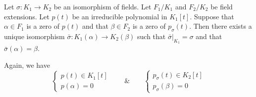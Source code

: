 \begin{prop}
Let $\sigma :K_1\rightarrow K_2$ be an isomorphism of fields. Let $F_1/K_1$ and $F_2/K_2$ be field extensions. Let $p(t)$ be an irreducible polynomial in $K_1[t]$. Suppose that $\alpha\in F_1 $ is a zero of $p(t)$ and that $\beta \in F_2$ is a zero of $p_{\sigma }(t)$. Then there exists a unique isomorphism $\bar{\sigma }:K_1(\alpha )\rightarrow K_2(\beta )$ such that $\bar{\sigma }|_{K_1}=\sigma $ and that $\bar{\sigma }(\alpha )=\beta $.
\begin{center}
\end{center}
Again, we have
\[\begin{cases}
p(t)\in K_1[t]\\
p(\alpha )=0 
\end{cases}\qquad \&\qquad \begin{cases}
p_{\sigma }(t)\in  K_2[t]\\
p_{\sigma }(\beta )=0
\end{cases}\]
\end{prop}
\vspace{2ex}
